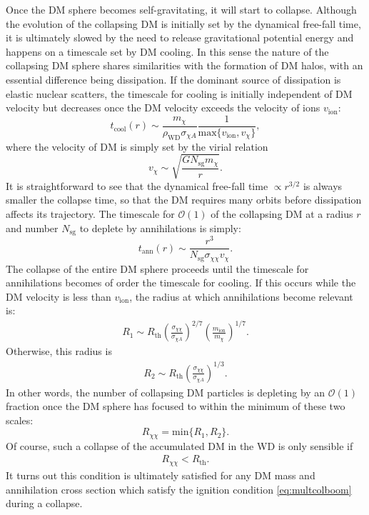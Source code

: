 \documentclass[preprintnumbers,amsmath,amssymb,prd,superscriptaddress]{revtex4}
\newcommand{\OO}{\mathcal{O}}
\def\r{\right)}
\def\l{\left(}
\begin{document}
Once the DM sphere becomes self-gravitating, it will start to collapse. 
Although the evolution of the collapsing DM is initially set by the dynamical free-fall time, it is ultimately slowed by the need to release gravitational potential energy and happens on a timescale set by DM cooling. 
In this sense the nature of the collapsing DM sphere shares similarities with the formation of DM halos, with an essential difference being dissipation. 
If the dominant source of dissipation is elastic nuclear scatters, the timescale for cooling is initially independent of DM velocity but decreases once the DM velocity exceeds the velocity of ions $v_\text{ion}$:
\begin{equation}
t_\text{cool}(r) \sim \frac{m_\chi}{\rho_\text{WD} \sigma_{\chi A}} \frac{1}{\text{max}\{{v_\text{ion},v_\chi\}}},
\end{equation}
where the velocity of DM is simply set by the virial relation 
\begin{equation}
v_\chi \sim \sqrt{\frac{G N_\text{sg} m_\chi}{r}}. 
\end{equation}
It is straightforward to see that the dynamical free-fall time $\propto r^{3/2}$ is always smaller the collapse time, so that the DM requires many orbits before dissipation affects its trajectory. 
The timescale for $\OO(1)$ of the collapsing DM at a radius $r$ and number $N_\text{sg}$ to deplete by annihilations is simply:
\begin{equation}
t_\text{ann}(r) \sim \frac{r^3}{N_\text{sg} \sigma_{\chi \chi} v_\chi}. 
\end{equation}
The collapse of the entire DM sphere proceeds until the timescale for annihilations becomes of order the timescale for cooling.
If this occurs while the DM velocity is less than $v_\text{ion}$, the radius at which annihilations become relevant is:
\begin{align}
R_1 \sim R_\text{th} \l \frac{\sigma_{\chi \chi}}{\sigma_{\chi A}}\r^{2/7} \l \frac{m_\text{ion}}{m_\chi} \r^{1/7}.
\end{align}
Otherwise, this radius is
\begin{align}
R_2 \sim R_\text{th} \l \frac{\sigma_{\chi \chi}}{\sigma_{\chi A}}\r^{1/3}. 
\end{align}
In other words, the number of collapsing DM particles is depleting by an $\OO(1)$ fraction once the DM sphere has focused to within the minimum of these two scales:
\begin{equation}
R_{\chi \chi} =  \text{min}\{R_1, R_2\}. 
\end{equation}
Of course, such a collapse of the accumulated DM in the WD is only sensible if
\begin{align}
\label{eq:xicondition}
R_{\chi \chi} < R_\text{th}.
\end{align}
It turns out this condition is ultimately satisfied for any DM mass and annihilation cross section which satisfy the ignition condition \eqref{eq:multcolboom} during a collapse. 
\end{document}
